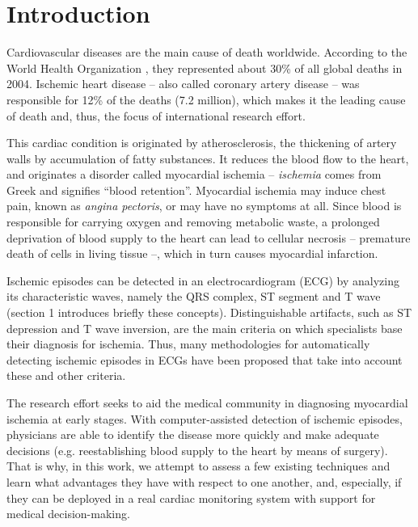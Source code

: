 
\section*{Introduction}
\label{sec:intro}

Cardiovascular diseases are the main cause of death worldwide. According to the World Health Organization \cite{Who04}, they represented about 30\% of all global deaths in 2004. Ischemic heart disease -- also called coronary artery disease -- was responsible for 12\% of the deaths (7.2 million), which makes it the leading cause of death and, thus, the focus of international research effort.

This cardiac condition is originated by atherosclerosis, the thickening of artery walls by accumulation of fatty substances. It reduces the blood flow to the heart, and originates a disorder called myocardial ischemia -- \textit{ischemia} comes from Greek and signifies ``blood retention''. Myocardial ischemia may induce chest pain, known as \textit{angina pectoris}, or may have no symptoms at all. Since blood is responsible for carrying oxygen and removing metabolic waste, a prolonged deprivation of blood supply to the heart can lead to cellular necrosis -- premature death of cells in living tissue --, which in turn causes myocardial infarction.

Ischemic episodes can be detected in an electrocardiogram (ECG) by analyzing its characteristic waves, namely the QRS complex, ST segment and T wave (section 1 introduces briefly these concepts). Distinguishable artifacts, such as ST depression and T wave inversion, are the main criteria on which specialists base their diagnosis for ischemia. Thus, many methodologies for automatically detecting ischemic episodes in ECGs have been proposed that take into account these and other criteria.

The research effort seeks to aid the medical community in diagnosing myocardial ischemia at early stages. With computer-assisted detection of ischemic episodes, physicians are able to identify the disease more quickly and make adequate decisions (e.g. reestablishing blood supply to the heart by means of surgery). That is why, in this work, we attempt to assess a few existing techniques and learn what advantages they have with respect to one another, and, especially, if they can be deployed in a real cardiac monitoring system with support for medical decision-making.

